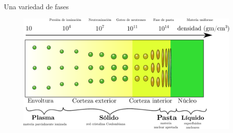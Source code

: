 \documentclass[11pt]{beamer}
\begin{document}
\begin{frame}{Una variedad de fases}
    \begin{figure}
        \centering
        \includegraphics[width=\linewidth]{Density.pdf}
    \end{figure}
\end{frame}
\end{document}
